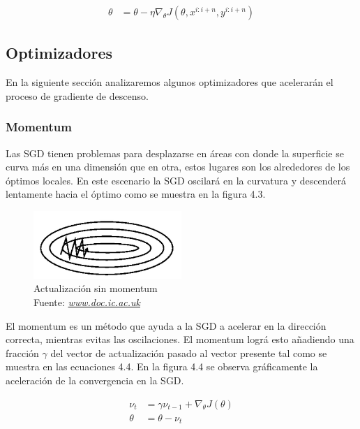 \begin{equation}
\label{mbgds}
\begin{aligned}
\theta &= \theta - \eta \nabla_{\theta} J(\theta,x^{i:i+n},y^{i:i+n})
\end{aligned}
\end{equation}



\subsection{Optimizadores}
En la siguiente sección analizaremos algunos optimizadores que acelerarán el proceso de gradiente de descenso.
\subsubsection{Momentum}
Las SGD tienen problemas para desplazarse en áreas con donde la superficie se curva más en una dimensión que en otra, estos lugares son los alrededores de los óptimos locales. En este escenario la SGD oscilará en la curvatura y descenderá lentamente hacia el óptimo como se muestra en la figura 4.3.
\begin{figure}[H]
	\centering
	\includegraphics[width=0.5\textwidth]{Figures/momentum1.png}
	\caption{Actualización sin momentum \\ Fuente:  \href{https://www.doc.ic.ac.uk/~js4416/163/website/neural-networks/optimisers.html}{\textit{www.doc.ic.ac.uk}}}
	\label{momentum1}
\end{figure}
El momentum es un método que ayuda a la SGD a acelerar en la dirección correcta, mientras evitas las oscilaciones. El momentum lográ esto añadiendo una fracción $\gamma$ del vector de actualización pasado al vector presente tal como se muestra en las ecuaciones 4.4. En la figura 4.4 se observa gráficamente la aceleración de la convergencia en la SGD.

\begin{equation}
\label{mbgds}
\begin{aligned}
\nu_{t}&=\gamma \nu_{t-1} +  \nabla_{\theta} J(\theta)\\
\theta &= \theta -\nu_{t}
\end{aligned}
\end{equation}

